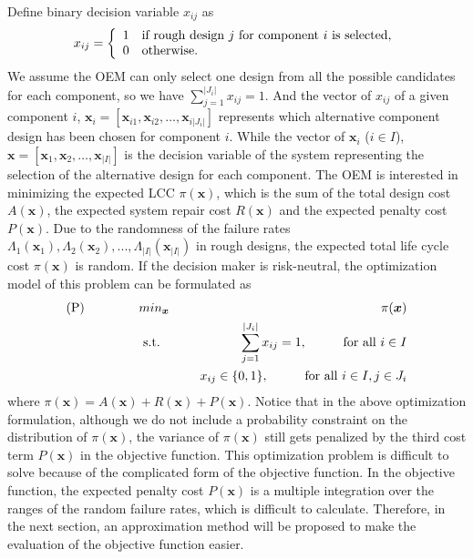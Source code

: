 \documentclass[preprint,12pt]{elsarticle}
\begin{document}
Define binary decision variable $x_{ij}$ as
	\[ x_{ij} = \left \{
	  \begin{array} {l l}
         1 & \textrm {if rough design $j$ for component $i$ is selected,}\\
         0 & \textrm {otherwise.}
		\end {array} \right.\]
 We assume the OEM can only select one design from all the possible candidates for each component, so we have $\sum^{\lvert J_{i}\rvert}_{j=1}{x_{ij}=1}$. And the vector of $x_{ij}$ of a given component $i$, $\boldsymbol{x}_{i}=[\boldsymbol{x}_{i1}, \boldsymbol{x}_{i2},\dots, \boldsymbol{x}_{i\lvert J_{i}\rvert}]$ represents which alternative component design has been chosen for component $i$. While the vector of $\boldsymbol{x}_{i}$ ($i \in I$), $\boldsymbol{x}=[\boldsymbol{x}_{1}, \boldsymbol{x}_{2},\dots, \boldsymbol{x}_{\lvert I \rvert}]$ is the decision variable of the system representing the selection of the alternative design for each component. The OEM is interested in minimizing the expected LCC $\pi(\boldsymbol{x})$, which is the sum of the total design cost $A(\boldsymbol{x})$, the expected system repair cost $R(\boldsymbol{x})$ and the expected penalty cost $P(\boldsymbol{x})$. Due to the randomness of the failure rates $\Lambda_{1}(\boldsymbol{x}_{1}),\Lambda_{2}(\boldsymbol{x}_{2}),...,\Lambda_{\lvert I \rvert}(\boldsymbol{x}_{\lvert I \rvert})$ in rough designs, the expected total life cycle cost $\pi(\boldsymbol{x})$ is random. If the decision maker is risk-neutral, the optimization model of this problem can be formulated as
\begin{eqnarray}
\text{(P)} \hspace{15mm} & min_{\boldsymbol{x}} & \hspace{10mm} \pi(\boldsymbol{x}) \nonumber\\
& \text{ s.t. }&  \hspace{5mm} \sum_{j=1}^{\lvert J_{i}\rvert }{x_{ij}}=1, \hspace{10mm} \text{for all $i$}  \in I \nonumber\\
& & \hspace{5mm} x_{ij} \in \{0,1\}, \hspace{10mm}  \text{for all $i$}  \in I, j \in J_{i}
\end{eqnarray}
where $\pi(\boldsymbol{x})=A(\boldsymbol{x})+R(\boldsymbol{x})+P(\boldsymbol{x})$. Notice that in the above optimization formulation, although we do not include a probability constraint on the distribution of $\pi(\boldsymbol{x})$, the variance of $\pi(\boldsymbol{x})$ still gets penalized by the third cost term $P(\boldsymbol{x})$ in the objective function. This optimization problem is difficult to solve because of the complicated form of the objective function. In the objective function, the expected penalty cost $P(\boldsymbol{x})$ is a multiple integration over the ranges of the random failure rates, which is difficult to calculate. Therefore, in the next section, an approximation method will be proposed to make the evaluation of the objective function easier.
\end{document}
